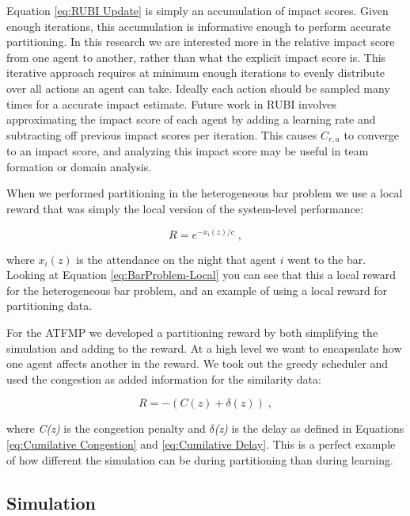 \documentclass[onehalf,11pt]{beavtex}
\begin{document}
Equation \ref{eq:RUBI Update} is simply an accumulation of impact scores. Given enough iterations, this accumulation is informative enough to perform accurate partitioning. In this research we are interested more in the relative impact score from one agent to another, rather than what the explicit impact score is. This iterative approach requires at minimum enough iterations to evenly distribute over all actions an agent can take. Ideally each action should be sampled many times for a accurate impact estimate. Future work in RUBI involves approximating the impact score of each agent by adding a learning rate and subtracting off previous impact scores per iteration. This causes $C_{r,a}$ to converge to an impact score, and analyzing this impact score may be useful in team formation or domain analysis.

When we performed partitioning in the heterogeneous bar problem we use a local reward that was simply the local version of the system-level performance:

\begin{equation}
R = e^{-x_i(z)/c} \;,
\end{equation}

where $x_i(z)$ is the attendance on the night that agent $i$ went to the bar. Looking at Equation \ref{eq:BarProblem-Local} you can see that this a local reward for the heterogeneous bar problem, and an example of using a local reward for partitioning data.

For the ATFMP we developed a partitioning reward by both simplifying the simulation and adding to the reward. At a high level we want to encapsulate how one agent affects another in the reward. We took out the greedy scheduler and used the congestion as added information for the similarity data:

\begin{equation} \label{eq:RUBI ATFMP-L}
R = -(C(z) + \delta(z))\;,
\end{equation}

where \textit{C(z)} is the congestion penalty and \textit{$\delta$(z)} is the delay as defined in Equations \ref{eq:Cumilative Congestion} and \ref{eq:Cumilative Delay}. This is a perfect example of how different the simulation can be during partitioning than during learning.

\subsection{Simulation}
\end{document}
